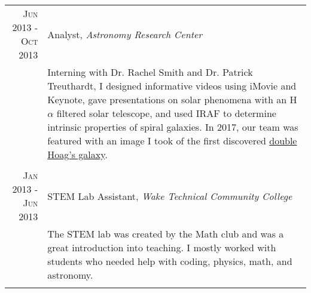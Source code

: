 \documentclass[a4paper,10pt]{article} %
\begin{document}
\begin{tabular}{r|p{11cm}}
\textsc{Jun 2013 - Oct 2013} & Analyst, \emph{Astronomy Research Center}\\
& \footnotesize{Interning with Dr. Rachel Smith and Dr. Patrick Treuthardt, I designed informative videos using iMovie and Keynote, gave presentations on solar phenomena with an H$\alpha$ filtered solar telescope, and used IRAF to determine intrinsic properties of spiral galaxies. In 2017, our team was featured with an image I took of the first discovered \href{http://www.wired.co.uk/article/new-hoag-type-galaxy-discovered}{double Hoag's galaxy}.}\\
\multicolumn{2}{c}{} \\


\textsc{Jan 2013 - Jun 2013} & STEM Lab Assistant, \emph{Wake Technical Community College}\\
& \footnotesize{The STEM lab was created by the Math club and was a great introduction into teaching. I mostly worked with students who needed help with coding, physics, math, and astronomy.}\\
\multicolumn{2}{c}{} \\


\end{tabular}
\bigskip
\end{document}
